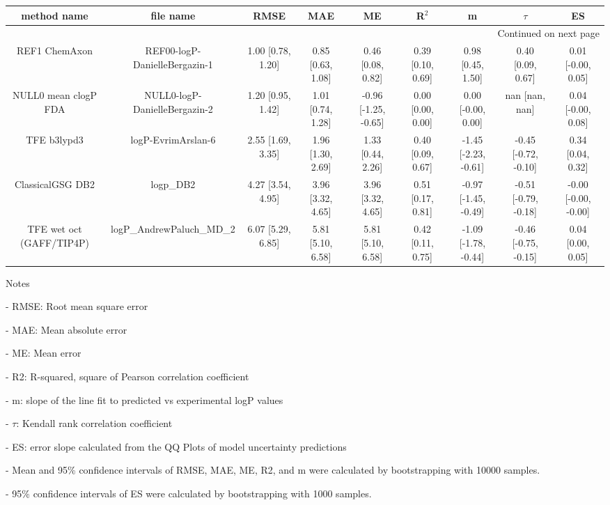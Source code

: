 \documentclass{article}
\begin{document}
\begin{center}
\scriptsize
\begin{longtable}{|ccccccccc|}
\toprule
              method name &                      file name &               RMSE &                MAE &                    ME &              R$^2$ &                     m &                $\tau$ &                    ES \\
\midrule
\endhead
\midrule
\multicolumn{9}{r}{{Continued on next page}} \\
\midrule
\endfoot

\bottomrule
\endlastfoot
            REF1 ChemAxon &  REF00-logP-DanielleBergazin-1 &  1.00 [0.78, 1.20] &  0.85 [0.63, 1.08] &     0.46 [0.08, 0.82] &  0.39 [0.10, 0.69] &     0.98 [0.45, 1.50] &     0.40 [0.09, 0.67] &    0.01 [-0.00, 0.05] \\
     NULL0 mean clogP FDA &  NULL0-logP-DanielleBergazin-2 &  1.20 [0.95, 1.42] &  1.01 [0.74, 1.28] &  -0.96 [-1.25, -0.65] &  0.00 [0.00, 0.00] &    0.00 [-0.00, 0.00] &        nan [nan, nan] &    0.04 [-0.00, 0.08] \\
              TFE b3lypd3 &             logP-EvrimArslan-6 &  2.55 [1.69, 3.35] &  1.96 [1.30, 2.69] &     1.33 [0.44, 2.26] &  0.40 [0.09, 0.67] &  -1.45 [-2.23, -0.61] &  -0.45 [-0.72, -0.10] &     0.34 [0.04, 0.32] \\
         ClassicalGSG DB2 &                      logp\_DB2 &  4.27 [3.54, 4.95] &  3.96 [3.32, 4.65] &     3.96 [3.32, 4.65] &  0.51 [0.17, 0.81] &  -0.97 [-1.45, -0.49] &  -0.51 [-0.79, -0.18] &  -0.00 [-0.00, -0.00] \\
 TFE wet oct (GAFF/TIP4P) &      logP\_AndrewPaluch\_MD\_2 &  6.07 [5.29, 6.85] &  5.81 [5.10, 6.58] &     5.81 [5.10, 6.58] &  0.42 [0.11, 0.75] &  -1.09 [-1.78, -0.44] &  -0.46 [-0.75, -0.15] &     0.04 [0.00, 0.05] \\
\end{longtable}
\end{center}

Notes

- RMSE: Root mean square error

- MAE: Mean absolute error

- ME: Mean error

- R2: R-squared, square of Pearson correlation coefficient

- m: slope of the line fit to predicted vs experimental logP values

- $\tau$:  Kendall rank correlation coefficient

- ES: error slope calculated from the QQ Plots of model uncertainty predictions

- Mean and 95\% confidence intervals of RMSE, MAE, ME, R2, and m were calculated by bootstrapping with 10000 samples.

- 95\% confidence intervals of ES were calculated by bootstrapping with 1000 samples.\end{document}
\end{document}
